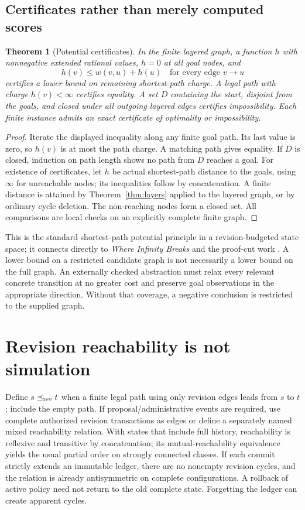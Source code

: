 \documentclass[11pt]{article}
\newtheorem{theorem}{Theorem}[section]
\theoremstyle{remark}\newtheorem{remark}[theorem]{Remark}
\begin{document}
\subsection{Certificates rather than merely computed scores}
\begin{theorem}[Potential certificates]\label{thm:cert}
In the finite layered graph, a function $h$ with nonnegative extended rational values, $h=0$ at all goal nodes, and
\[
 h(v)\le w(v,u)+h(u)\quad\text{for every edge }v\to u
\]
certifies a lower bound on remaining shortest-path charge. A legal path with charge $h(v)<\infty$ certifies equality. A set $D$ containing the start, disjoint from the goals, and closed under all outgoing layered edges certifies impossibility. Each finite instance admits an exact certificate of optimality or impossibility.
\end{theorem}
\begin{proof}
Iterate the displayed inequality along any finite goal path. Its last value is zero, so $h(v)$ is at most the path charge. A matching path gives equality. If $D$ is closed, induction on path length shows no path from $D$ reaches a goal. For existence of certificates, let $h$ be actual shortest-path distance to the goals, using $\infty$ for unreachable nodes; its inequalities follow by concatenation. A finite distance is attained by Theorem~\ref{thm:layers} applied to the layered graph, or by ordinary cycle deletion. The non-reaching nodes form a closed set. All comparisons are local checks on an explicitly complete finite graph.
\end{proof}
This is the standard shortest-path potential principle in a revision-budgeted state space; it connects directly to \emph{Where Infinity Breaks} and the proof-cut work \cite{infty,obstruction}. A lower bound on a restricted candidate graph is not necessarily a lower bound on the full graph. An externally checked abstraction must relax every relevant concrete transition at no greater cost and preserve goal observations in the appropriate direction. Without that coverage, a negative conclusion is restricted to the supplied graph.

\section{Revision reachability is not simulation}
Define $s\preceq_{\rm rev}t$ when a finite legal path using only revision edges leads from $s$ to $t$; include the empty path. If proposal/administrative events are required, use complete authorized revision transactions as edges or define a separately named mixed reachability relation. With states that include full history, reachability is reflexive and transitive by concatenation; its mutual-reachability equivalence yields the usual partial order on strongly connected classes. If each commit strictly extends an immutable ledger, there are no nonempty revision cycles, and the relation is already antisymmetric on complete configurations. A rollback of active policy need not return to the old complete state. Forgetting the ledger can create apparent cycles.
\end{document}
